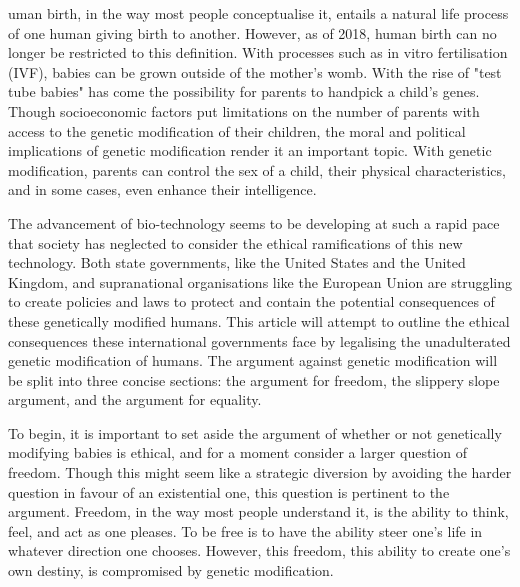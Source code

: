 
{\flushright{}}
\smallskip

   uman birth, in the way most people conceptualise it, entails a natural
   life process of one human giving birth to another. However, as of 2018,
   human birth can no longer be restricted to this definition. With
   processes such as in vitro fertilisation (IVF), babies can be grown
   outside of the mother's womb. With the rise of "test tube babies" has
   come the possibility for parents to handpick a child's genes. Though
   socioeconomic factors put limitations on the number of parents with
   access to the genetic modification of their children, the moral and
   political implications of genetic modification render it an important
   topic. With genetic modification, parents can control the sex of a
   child, their physical characteristics, and in some cases, even enhance
   their intelligence.

   The advancement of bio-technology seems to be developing at such a
   rapid pace that society has neglected to consider the ethical
   ramifications of this new technology. Both state governments, like the
   United States and the United Kingdom, and supranational organisations
   like the European Union are struggling to create policies and laws to
   protect and contain the potential consequences of these genetically
   modified humans. This article will attempt to outline the ethical
   consequences these international governments face by legalising the
   unadulterated genetic modification of humans. The argument against
   genetic modification will be split into three concise sections: the
   argument for freedom, the slippery slope argument, and the argument for
   equality.

   To begin, it is important to set aside the argument of whether or not
   genetically modifying babies is ethical, and for a moment consider a
   larger question of freedom. Though this might seem like a strategic
   diversion by avoiding the harder question in favour of an existential
   one, this question is pertinent to the argument. Freedom, in the way
   most people understand it, is the ability to think, feel, and act as
   one pleases. To be free is to have the ability steer one's life in
   whatever direction one chooses. However, this freedom, this ability to
   create one's own destiny, is compromised by genetic modification.

